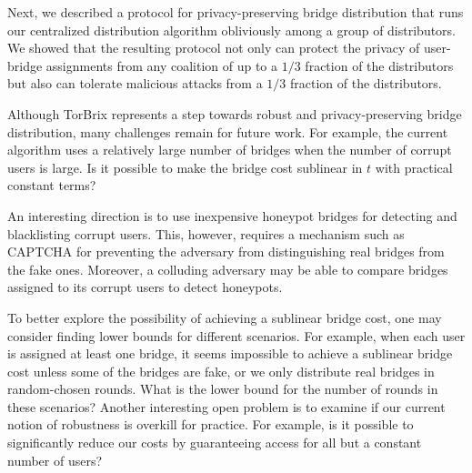 \documentclass[letterpaper,twocolumn,10pt]{article}
\newcommand{\sfsize}{\fontsize{0.73\baselineskip}{0.73\baselineskip}\selectfont}
\newcommand{\sans}[1]{\textsf{\sfsize \mbox{#1}}}
\newcommand{\brix}{\sans{TorBrix}\xspace}
\begin{document}
Next, we described a protocol for privacy-preserving bridge distribution that runs our centralized distribution algorithm obliviously among a group of distributors. We showed that the resulting protocol not only can protect the privacy of user-bridge assignments from any coalition of up to a $1/3$ fraction of the distributors but also can tolerate malicious attacks from a $1/3$ fraction of the distributors. %

Although \brix represents a step towards robust and privacy-preserving bridge distribution, many challenges remain for future work. For example, the current algorithm uses a relatively large number of bridges when the number of corrupt users is large. Is it possible to make the bridge cost sublinear in $t$ with practical constant terms? 

An interesting direction is to use inexpensive honeypot bridges for detecting and blacklisting corrupt users. This, however, requires a mechanism such as CAPTCHA for preventing the adversary from distinguishing real bridges from the fake ones. Moreover, a colluding adversary may be able to compare bridges assigned to its corrupt users to detect honeypots.

To better explore the possibility of achieving a sublinear bridge cost, one may consider finding lower bounds for different scenarios. For example, when each user is assigned at least one bridge, it seems impossible to achieve a sublinear bridge cost unless some of the bridges are fake, or we only distribute real bridges in random-chosen rounds. What is the lower bound for the number of rounds in these scenarios?
Another interesting open problem is to examine if our current notion of robustness is overkill for practice. For example, is it possible to significantly reduce our costs by guaranteeing access for all but a constant number of users? %



\end{document}
